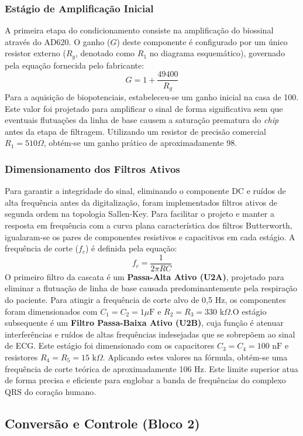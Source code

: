 \documentclass[tcc,capa]{texufpel}
\begin{document}
\subsubsection{Estágio de Amplificação Inicial}A primeira etapa do condicionamento consiste na amplificação do biossinal através do AD620. O ganho ($G$) deste componente é configurado por um único resistor externo ($R_g$, denotado como $R_1$ no diagrama esquemático), governado pela equação fornecida pelo fabricante:$$G = 1 + \frac{49400}{R_g}$$Para a aquisição de biopotenciais, estabeleceu-se um ganho inicial na casa de 100. Este valor foi projetado para amplificar o sinal de forma significativa sem que eventuais flutuações da linha de base causem a saturação prematura do \textit{chip} antes da etapa de filtragem. Utilizando um resistor de precisão comercial $R_1 = 510 \Omega$, obtém-se um ganho prático de aproximadamente 98.

\subsubsection{Dimensionamento dos Filtros Ativos}Para garantir a integridade do sinal, eliminando o componente DC e ruídos de alta frequência antes da digitalização, foram implementados filtros ativos de segunda ordem na topologia Sallen-Key. Para facilitar o projeto e manter a resposta em frequência com a curva plana característica dos filtros Butterworth, igualaram-se os pares de componentes resistivos e capacitivos em cada estágio. A frequência de corte ($f_c$) é definida pela equação:$$f_c = \frac{1}{2\pi R C}$$O primeiro filtro da cascata é um \textbf{Passa-Alta Ativo (U2A)}, projetado para eliminar a flutuação de linha de base causada predominantemente pela respiração do paciente. Para atingir a frequência de corte alvo de 0,5 Hz, os componentes foram dimensionados com $C_1 = C_2 = 1 \mu\text{F}$ e $R_2 = R_3 = 330 \text{ k}\Omega$.O estágio subsequente é um \textbf{Filtro Passa-Baixa Ativo (U2B)}, cuja função é atenuar interferências e ruídos de altas frequências indesejadas que se sobrepõem ao sinal de ECG. Este estágio foi dimensionado com os capacitores $C_3 = C_4 = 100 \text{ nF}$ e resistores $R_4 = R_5 = 15 \text{ k}\Omega$. Aplicando estes valores na fórmula, obtém-se uma frequência de corte teórica de aproximadamente 106 Hz. Este limite superior atua de forma precisa e eficiente para englobar a banda de frequências do complexo QRS do coração humano.

\subsection{Conversão e Controle (Bloco 2)}
\end{document}
